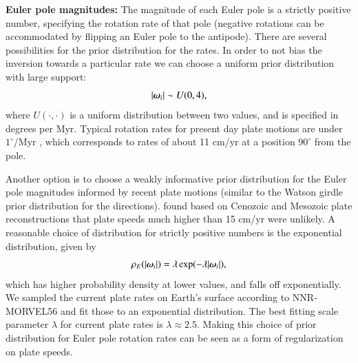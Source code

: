 \documentclass[preprint,12pt,authoryear]{elsarticle}
\newcommand{\mitbf}[1]{\hbox{\mathversion{bold}$#1$}}
\begin{document}
\textbf{Euler pole magnitudes:} 
The magnitude of each Euler pole is a strictly positive number, specifying the
rotation rate of that pole (negative rotations can be accommodated by flipping an Euler
pole to the antipode).
There are several possibilities for the prior distribution for the rates.
In order to not bias the inversion towards a particular
rate we can choose a uniform prior distribution with large support:
\begin{equation}
\vert \mitbf{\omega}_i \vert \sim U(0, 4),
\end{equation}
where $U(\cdot, \cdot)$ is a uniform distribution between two values, and is specified 
in degrees per Myr. Typical rotation rates for present day plate motions
are under $1^\circ$/Myr \citep{argus2011geologically}, which corresponds to rates
of about 11 cm/yr at a position $90^\circ$ from the pole.

Another option is to choose a weakly informative prior distribution for the Euler pole magnitudes
informed by recent plate motions (similar to the Watson girdle prior distribution for the directions).
\citet{zahirovic2015tectonic} found based on Cenozoic and Mesozoic plate reconstructions
that plate speeds much higher than 15 cm/yr were unlikely.
A reasonable choice of distribution for strictly positive numbers is the exponential distribution,
given by
\begin{equation}
\rho_E(\vert \mitbf{\omega}_i \vert) = \lambda \exp(-\lambda \vert \mitbf{\omega}_i \vert),
\end{equation}
which has higher probability density at lower values, and falls off exponentially.
We sampled the current plate rates on Earth's surface according to NNR-MORVEL56
and fit those to an exponential distribution. The best fitting scale parameter $\lambda$
for current plate rates is $\lambda\approx2.5$.
Making this choice of prior distribution for Euler pole rotation rates can be seen as a form
of regularization on plate speeds.
\end{document}
